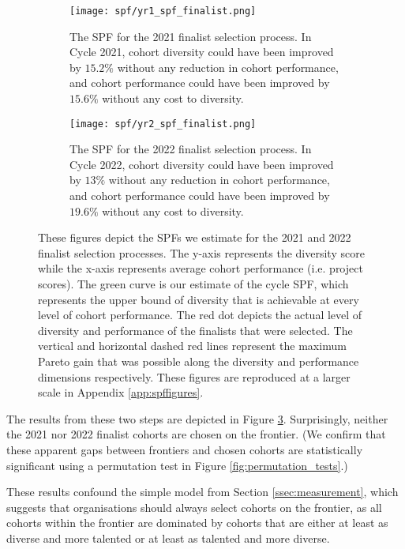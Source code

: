 \begin{figure}[htbp]
    \centering
    \begin{subfigure}[b]{0.4\textwidth}
        \texttt{[image: spf/yr1\_spf\_finalist.png]}
        \caption{The SPF for the 2021 finalist selection process. In Cycle 2021, cohort diversity could have been improved by $15.2\%$ without any reduction in cohort performance, and cohort performance could have been improved by $15.6\%$ without any cost to diversity.}
        \label{fig:spf_2021}
    \end{subfigure}
    \hfill
    \begin{subfigure}[b]{0.4\textwidth}
        \texttt{[image: spf/yr2\_spf\_finalist.png]}
        \caption{The SPF for the 2022 finalist selection process. In Cycle 2022, cohort diversity could have been improved by $13\%$ without any reduction in cohort performance, and cohort performance could have been improved by $19.6\%$ without any cost to diversity.}
        \label{fig:spf_2022}
    \end{subfigure}
    \caption{These figures depict the SPFs we estimate for the 2021 and 2022 finalist selection processes. The y-axis represents the diversity score while the x-axis represents average cohort performance (i.e. project scores). The green curve is our estimate of the cycle SPF, which represents the upper bound of diversity that is achievable at every level of cohort performance. The red dot depicts the actual level of diversity and performance of the finalists that were selected. The vertical and horizontal dashed red lines represent the maximum Pareto gain that was possible along the diversity and performance dimensions respectively. These figures are reproduced at a larger scale in Appendix \ref{app:spffigures}.}
    \label{fig:spf_2021_2022}
\end{figure}

The results from these two steps are depicted in Figure \ref{fig:spf_2021_2022}. Surprisingly, neither the 2021 nor 2022 finalist cohorts are chosen on the frontier. (We confirm that these apparent gaps between frontiers and chosen cohorts are statistically significant using a permutation test in Figure \ref{fig:permutation_tests}.)

These results confound the simple model from Section \ref{ssec:measurement}, which suggests that organisations should always select cohorts on the frontier, as all cohorts within the frontier are dominated by cohorts that are either at least as diverse and more talented or at least as talented and more diverse.

